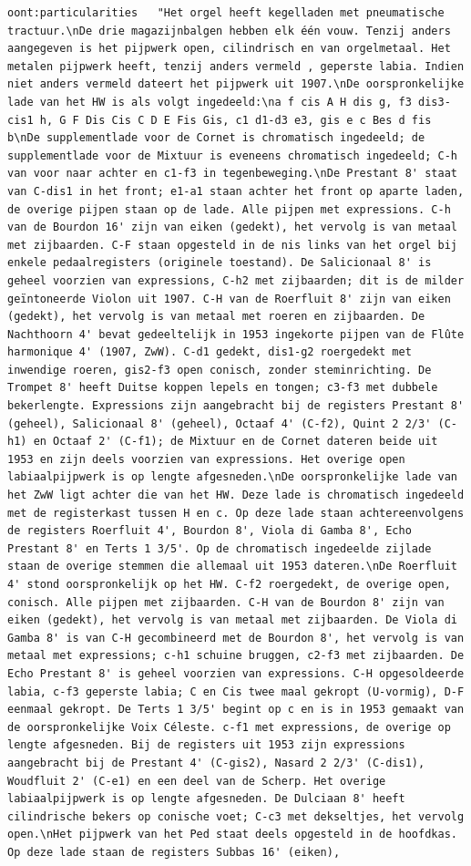 \begin{lstlisting}[caption={Part14\_000GravenhageNoorderkerk}]
        oont:particularities   "Het orgel heeft kegelladen met pneumatische tractuur.\nDe drie magazijnbalgen hebben elk één vouw. Tenzij anders aangegeven is het pijpwerk open, cilindrisch en van orgelmetaal. Het metalen pijpwerk heeft, tenzij anders vermeld , geperste labia. Indien niet anders vermeld dateert het pijpwerk uit 1907.\nDe oorspronkelijke lade van het HW is als volgt ingedeeld:\na f cis A H dis g, f3 dis3-cis1 h, G F Dis Cis C D E Fis Gis, c1 d1-d3 e3, gis e c Bes d fis b\nDe supplementlade voor de Cornet is chromatisch ingedeeld; de supplementlade voor de Mixtuur is eveneens chromatisch ingedeeld; C-h van voor naar achter en c1-f3 in tegenbeweging.\nDe Prestant 8' staat van C-dis1 in het front; e1-a1 staan achter het front op aparte laden, de overige pijpen staan op de lade. Alle pijpen met expressions. C-h van de Bourdon 16' zijn van eiken (gedekt), het vervolg is van metaal met zijbaarden. C-F staan opgesteld in de nis links van het orgel bij enkele pedaalregisters (originele toestand). De Salicionaal 8' is geheel voorzien van expressions, C-h2 met zijbaarden; dit is de milder geïntoneerde Violon uit 1907. C-H van de Roerfluit 8' zijn van eiken (gedekt), het vervolg is van metaal met roeren en zijbaarden. De Nachthoorn 4' bevat gedeeltelijk in 1953 ingekorte pijpen van de Flûte harmonique 4' (1907, ZwW). C-d1 gedekt, dis1-g2 roergedekt met inwendige roeren, gis2-f3 open conisch, zonder steminrichting. De Trompet 8' heeft Duitse koppen lepels en tongen; c3-f3 met dubbele bekerlengte. Expressions zijn aangebracht bij de registers Prestant 8' (geheel), Salicionaal 8' (geheel), Octaaf 4' (C-f2), Quint 2 2/3' (C-h1) en Octaaf 2' (C-f1); de Mixtuur en de Cornet dateren beide uit 1953 en zijn deels voorzien van expressions. Het overige open labiaalpijpwerk is op lengte afgesneden.\nDe oorspronkelijke lade van het ZwW ligt achter die van het HW. Deze lade is chromatisch ingedeeld met de registerkast tussen H en c. Op deze lade staan achtereenvolgens de registers Roerfluit 4', Bourdon 8', Viola di Gamba 8', Echo Prestant 8' en Terts 1 3/5'. Op de chromatisch ingedeelde zijlade staan de overige stemmen die allemaal uit 1953 dateren.\nDe Roerfluit 4' stond oorspronkelijk op het HW. C-f2 roergedekt, de overige open, conisch. Alle pijpen met zijbaarden. C-H van de Bourdon 8' zijn van eiken (gedekt), het vervolg is van metaal met zijbaarden. De Viola di Gamba 8' is van C-H gecombineerd met de Bourdon 8', het vervolg is van metaal met expressions; c-h1 schuine bruggen, c2-f3 met zijbaarden. De Echo Prestant 8' is geheel voorzien van expressions. C-H opgesoldeerde labia, c-f3 geperste labia; C en Cis twee maal gekropt (U-vormig), D-F eenmaal gekropt. De Terts 1 3/5' begint op c en is in 1953 gemaakt van de oorspronkelijke Voix Céleste. c-f1 met expressions, de overige op lengte afgesneden. Bij de registers uit 1953 zijn expressions aangebracht bij de Prestant 4' (C-gis2), Nasard 2 2/3' (C-dis1), Woudfluit 2' (C-e1) en een deel van de Scherp. Het overige labiaalpijpwerk is op lengte afgesneden. De Dulciaan 8' heeft cilindrische bekers op conische voet; C-c3 met dekseltjes, het vervolg open.\nHet pijpwerk van het Ped staat deels opgesteld in de hoofdkas. Op deze lade staan de registers Subbas 16' (eiken), 
\end{lstlisting}
